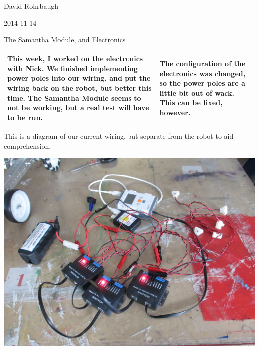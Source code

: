 David Rohrbaugh

2014-11-14

The Samantha Module, and Electronics

\begin{tabular}{|p{5cm}|p{5cm}|}
 \hline
 This week, I worked on the electronics with Nick. We finished implementing power poles into our wiring, and put the wiring back on the robot, but better this time. The Samantha Module seems to not be working, but a real test will have to be run.
 &
 The configuration of the electronics was changed, so the power poles are a little bit out of wack. This can be fixed, however.
 \\
 \hline
\end{tabular}

\medskip

This is a diagram of our current wiring, but separate from the robot to aid comprehension.

\begin{center}
 \includegraphics[width=\textwidth]{./Entries/Images/wiring1.jpg}
\end{center}
